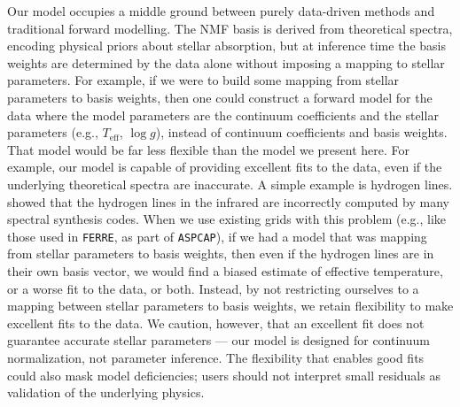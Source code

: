 \documentclass[modern,linenumbers]{aastex631}
\renewcommand{\added}[1]{#1}
\newcommand{\removed}[1]{}
\begin{document}
\added{Our model occupies a middle ground between purely data-driven methods and traditional forward modelling. The NMF basis is derived from theoretical spectra, encoding physical priors about stellar absorption, but at inference time the basis weights are determined by the data alone without imposing a mapping to stellar parameters.} \removed{Chosing not to interpret the basis vectors or weights has specific advantages.} For example, if we were to build some mapping from stellar parameters to basis weights, then one could construct a forward model for the data where the model parameters are the continuum coefficients and the stellar parameters (e.g., $T_\mathrm{eff}$, $\log{g}$), instead of continuum coefficients and basis weights. That model would be far less flexible than the model we present here. For example, our model is capable of providing excellent fits to the data, even if the underlying theoretical spectra are inaccurate. A simple example is hydrogen lines. \citet{Wheeler:2024} showed that the hydrogen lines in the infrared are incorrectly computed by many spectral synthesis codes. When we use existing grids with this problem (e.g., like those used in \texttt{FERRE}, as part of \texttt{ASPCAP}), if we had a model that was mapping from stellar parameters to basis weights, then even if the hydrogen lines are in their own basis vector, we would find a biased estimate of effective temperature, or a worse fit to the data, or both. Instead, by not restricting ourselves to a mapping between stellar parameters to basis weights, we retain flexibility to make excellent fits to the data. \added{We caution, however, that an excellent fit does not guarantee accurate stellar parameters --- our model is designed for continuum normalization, not parameter inference. The flexibility that enables good fits could also mask model deficiencies; users should not interpret small residuals as validation of the underlying physics.}\\
\end{document}

